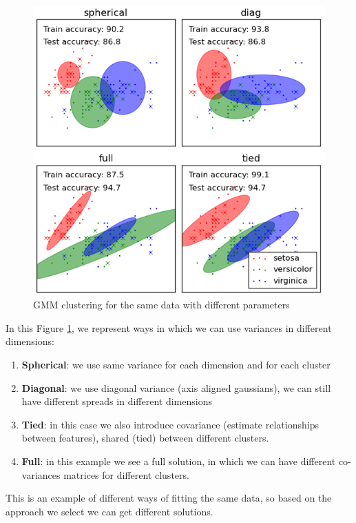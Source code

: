         \begin{figure}[ht]
            \centering
            \includegraphics[scale=0.5]{images/GMM.png}
            \caption{GMM clustering for the same data with different parameters}
            \label{fig:GMM}
        \end{figure}

        In this Figure \ref{fig:GMM}, we represent ways in which we can use variances in different dimensions:
        \begin{enumerate}
            \item \textbf{Spherical}: we use same variance for each dimension and for each cluster
            \item \textbf{Diagonal}: we use diagonal variance (axis aligned gaussians), we can still have different spreads in different dimensions
            \item \textbf{Tied}: in this case we also introduce covariance (estimate relationships between features), shared (tied) between different clusters. 
            \item \textbf{Full}: in this example we see a full solution, in which we can have different co-variances matrices for different clusters.
        \end{enumerate}
        This is an example of different ways of fitting the same data, so based on the approach we select we can get different solutions.\\

